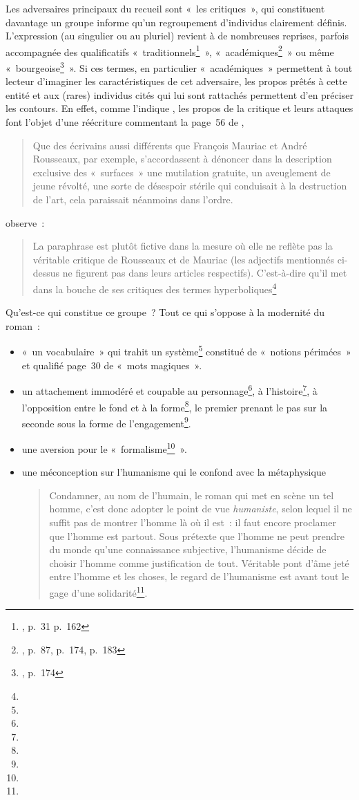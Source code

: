 Les adversaires principaux du recueil sont «~les critiques~», qui constituent davantage un groupe informe qu'un regroupement d'individus clairement définis. L'expression (au singulier ou au pluriel) revient à de nombreuses reprises, parfois accompagnée des qualificatifs «~traditionnels\footnote{, p.~31 p.~162}~», «~académiques\footnote{, p.~87, p.~174, p.~183}~» ou même «~bourgeoise\footnote{, p.~174}~». Si ces termes, en particulier «~académiques~» permettent à tout lecteur d'imaginer les caractéristiques de cet adversaire, les propos prêtés à cette entité et aux (rares) individus cités qui lui sont rattachés permettent d'en préciser les contours. En effet, comme l'indique \galia, les propos de la critique et leurs attaques font l'objet d'une réécriture commentant la page~56 de \punr,
\begin{quote}
    Que des écrivains aussi différents que François Mauriac et André Rousseaux, par exemple, s’accordassent à dénoncer dans la description exclusive des «~surfaces~» une mutilation gratuite, un aveuglement de jeune révolté, une sorte de désespoir stérile qui conduisait à la destruction de l’art, cela paraissait néanmoins dans l’ordre.
\end{quote}
\galia{} observe~:
\begin{quote}
    La paraphrase est plutôt fictive dans la mesure où elle ne reflète pas la véritable critique de Rousseaux et de Mauriac (les adjectifs mentionnés ci-dessus ne figurent pas dans leurs articles respectifs). C’est-à-dire qu’il met dans la bouche de ses critiques des termes hyperboliques\footnote{}
\end{quote}
Qu'est-ce qui constitue ce groupe~? Tout ce qui s'oppose à la modernité du roman~:
\begin{itemize}
    \item «~un vocabulaire~» qui trahit un système\footnote{} constitué de «~notions périmées~» et qualifié page~30 de «~mots magiques~».
    \item un attachement immodéré et coupable au personnage\footnote{}, à l'histoire\footnote{}, à l'opposition entre le fond et à la forme\footnote{}, le premier prenant le pas sur la seconde sous la forme de l'engagement\footnote{}.
    \item une aversion pour le «~formalisme\footnote{}~».
    \item une méconception sur l'humanisme qui le confond avec la métaphysique
    \begin{quote}
        Condamner, au nom de l’humain, le roman qui met en scène un tel homme, c’est donc adopter le point de vue \textit{humaniste}, selon lequel il ne suffit pas de montrer l’homme là où il est~: il faut encore proclamer que l’homme est partout. Sous prétexte que l’homme ne peut prendre du monde qu’une connaissance subjective, l’humanisme décide de choisir l’homme comme justification de tout. Véritable pont d’âme jeté entre l’homme et les choses, le regard de l’humanisme est avant tout le gage d’une solidarité\footnote{}.
    \end{quote} 
\end{itemize}

